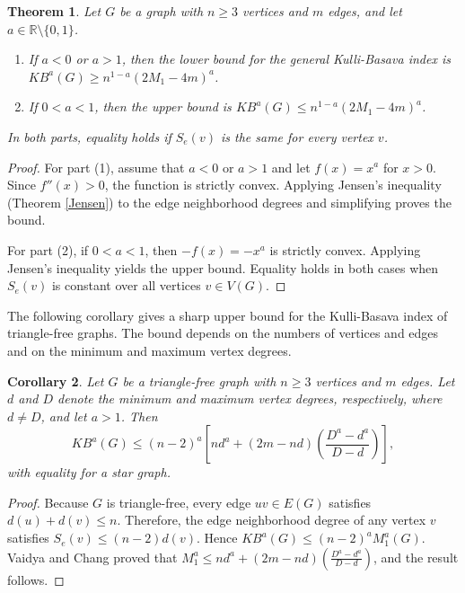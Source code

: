 \documentclass[10pt,a4paper]{amsart}
\newtheorem{theorem}{Theorem}[section]
\newtheorem{cor}[theorem]{Corollary}
\numberwithin{equation}{section}
\begin{document}
\begin{theorem}
Let $G$ be a graph with $n\geq 3$ vertices and $m$ edges, and let $a\in\mathbb{R}\setminus\{0,1\}$.

\begin{enumerate}
       
\item If $a < 0$ or $a > 1$, then the lower bound for the general Kulli-Basava index is $KB^a(G) \geq n^{1 - a} (2M_1 - 4m)^a $.

\item If $0<a<1$, then the upper bound  is $KB^a(G)  \leq n^{1 - a}(2M_1 - 4m)^a$.
   

    
\end{enumerate}
In both parts, equality holds if $S_e(v)$ is the same for every vertex $v$.
\end{theorem}
\begin{proof}
For part (1), assume that $a<0$ or $a>1$ and let $f(x)=x^a$ for $x>0$. Since $f''(x)>0$, the function is strictly convex. Applying Jensen's inequality (Theorem \ref{Jensen}) to the edge neighborhood degrees and simplifying proves the bound.

For part (2), if $0<a<1$, then $-f(x)=-x^a$ is strictly convex. Applying Jensen's inequality yields the upper bound. Equality holds in both cases when $S_e(v)$ is constant over all vertices $v\in V(G)$.
\end{proof}

The following corollary gives a sharp upper bound for the Kulli-Basava index of triangle-free graphs. The bound depends on the numbers of vertices and edges and on the minimum and maximum vertex degrees.

\begin{cor}
Let $G$ be a triangle-free graph with $n\geq 3$ vertices and $m$ edges. Let $d$ and $D$ denote the minimum and maximum vertex degrees, respectively, where $d\neq D$, and let $a>1$. Then
\[
KB^a(G)\leq(n-2)^a\left[nd^a+(2m-nd)\left(\frac{D^a-d^a}{D-d}\right)\right],
\]
with equality for a star graph.
\end{cor}

\begin{proof}
Because $G$ is triangle-free, every edge $uv\in E(G)$ satisfies $d(u)+d(v)\leq n$. Therefore, the edge neighborhood degree of any vertex $v$ satisfies $S_e(v)\leq(n-2)d(v)$. Hence $KB^a(G)\leq(n-2)^aM_1^a(G)$. Vaidya and Chang \cite{vaidya2024sharp} proved that $M_1^a\leq nd^a+(2m-nd)\left(\frac{D^a-d^a}{D-d}\right)$, and the result follows.
\end{proof}
\end{document}
